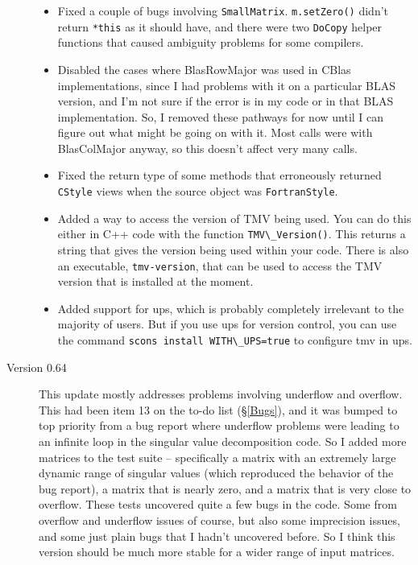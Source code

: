 \documentclass[twoside,letterpaper,11pt]{article}
\renewcommand{\tt}[1]{{\lstinline {#1}}}
\begin{document}
\begin{description}
\begin{itemize}
\item
Fixed a couple of bugs involving \tt{SmallMatrix}.  
\tt{m.setZero()} didn't return \tt{*this} as it should have,
and there were two \tt{DoCopy} helper functions that caused 
ambiguity problems for some compilers.

\item
Disabled the cases where BlasRowMajor was used in CBlas implementations, 
since I had problems
with it on a particular BLAS version, and I'm not sure if the error
is in my code or in that BLAS implementation.
So, I removed these pathways for now until I can figure out what might
be going on with it.  Most calls were with BlasColMajor anyway, so this
doesn't affect very many calls.

\item
Fixed the return type of some methods that erroneously returned \tt{CStyle}
views when the source object was \tt{FortranStyle}.

\item
Added a way to access the version of TMV being used.
You can do this either in C++ code with the function \tt{TMV\_Version()}.
This returns a string that gives the version being used within your code.
There is also an executable, \tt{tmv-version}, that can be used to access
the TMV version that is installed at the moment.

\item
Added support for ups, which is probably completely irrelevant
to the majority of users.  But if you use ups for version control, you can
use the command \tt{scons install WITH\_UPS=true} to configure tmv in ups.

\end{itemize}

\item[Version 0.64]
This update mostly addresses problems involving underflow and overflow.  This had 
been item 13 on the to-do list (\S\ref{Bugs}), and it was bumped to top priority from
a bug report where underflow problems were leading to an infinite loop in the 
singular value decomposition code.  So I added more matrices to the test suite -- 
specifically a matrix with an extremely large dynamic range of singular values
(which reproduced the behavior of the bug report), a matrix that is nearly zero,
and a matrix that is very close to overflow.  These tests uncovered quite a few bugs 
in the code.  Some from overflow and underflow issues of course, but also some
imprecision issues, and some just plain bugs that I hadn't uncovered before.  So 
I think this version should be much more stable for a wider range of input matrices.


\end{description}
\end{document}
